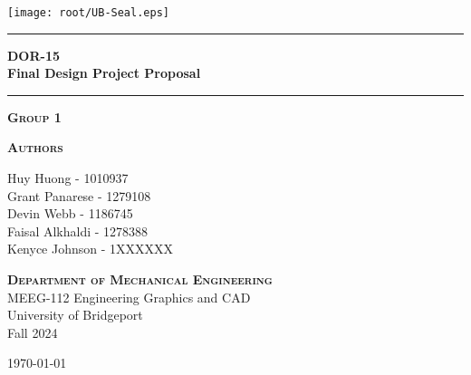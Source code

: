 
\begin{titlepage}
\begin{center}
\vspace{1 cm}
\texttt{[image: root/UB-Seal.eps]}~\\[1 cm]
\vspace{1 cm}

\hrule
\vspace{.5 cm}
{ \huge \bfseries DOR-15}
\vspace{.5 cm}
\\{\huge \bfseries Final Design Project Proposal} %
\vspace{.5 cm}

\hrule
\vspace{1 cm}

\textsc{\textbf{Group 1}} \\

\vspace{.5 cm}

\textsc{\textbf{Authors}}\\ %
\centering

Huy Huong - 1010937\\
Grant Panarese - 1279108\\
Devin Webb - 1186745\\
Faisal Alkhaldi - 1278388\\
Kenyce Johnson - 1XXXXXX\\


\vspace{.5 cm}

\textsc{\textbf{Department of Mechanical Engineering}}\\
\centering
    MEEG-112 Engineering Graphics and CAD \\
    University of Bridgeport \\
    Fall 2024 \\

\vspace{1 cm}

\centering \today %
\end{center}
\end{titlepage}
